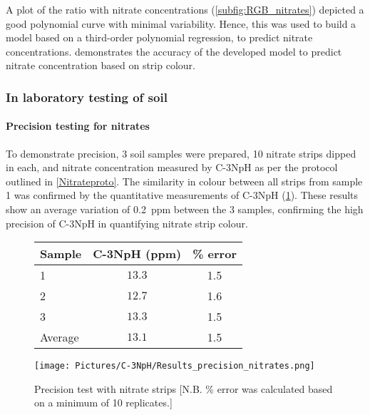A plot of the ratio with nitrate concentrations (\cref{subfig:RGB_nitrates}) depicted a good polynomial curve with minimal variability. Hence, this was used to build a model based on a third-order polynomial regression, to predict nitrate concentrations.  demonstrates the accuracy of the developed model to predict nitrate concentration based on strip colour.

\subsubsection{In laboratory testing of soil}
\paragraph{Precision testing for nitrates} 
To demonstrate %
precision, 3 soil samples were prepared, %
10 nitrate strips dipped in each, and nitrate concentration measured by C-3NpH as per the protocol outlined in \cref{Nitrateproto}. %
The similarity in colour between all strips from sample 1 was confirmed by the quantitative measurements of C-3NpH (\cref{fig:precision_nitrates}). These results show an average variation of \SI{0.2}{ppm} between the 3 samples, confirming the high precision of C-3NpH in quantifying nitrate strip colour. 

\begin{figure}[h!]
	\centering
	\begin{minipage}[c]{0.5\textwidth}
		\centering
		\begin{tabular} {l c c}
			\toprule
			\textbf{Sample} & \textbf{C-3NpH (ppm)} & \textbf{\% error} \\
			\midrule
			1 & $13.3$ & 1.5 \\ 
			2 & $12.7$ & 1.6 \\ 
			3 & $13.3$ & 1.5 \\ 
			\midrule
			Average & $13.1$ & 1.5\\ 
			\bottomrule
		\end{tabular} 
		\label{table:nitrates_precision} 
	\end{minipage} 
	\begin{minipage}[c]{0.40\textwidth}
		\centering
		\texttt{[image: Pictures/C-3NpH/Results\_precision\_nitrates.png]} \end{minipage}
			\captionsetup{justification = centering}
			\caption{Precision test with nitrate strips \small [N.B. \% error was calculated based on a minimum of 10 replicates.]} \label{fig:precision_nitrates}
\end{figure}

